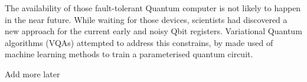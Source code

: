 The availability of those fault-tolerant Quantum computer is not likely to happen in the near future. 
While waiting for those devices, scientists had discovered a new approach for the current early and noisy Qbit registers.
Variational Quantum algorithms (VQAs) \cite{cerezo2021variational} attempted to address this constrains, by made used of machine learning methods to train a parameterised quantum circuit.

\begin{center}
    \vspace{10pt}
    Add more later
    \vspace{10pt} 
\end{center}
